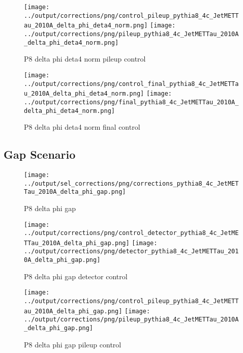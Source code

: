 \documentclass[11pt]{book}
\begin{document}
\begin{figure}[ht]
\centering
\texttt{[image: ../output/corrections/png/control\_pileup\_pythia8\_4c\_JetMETTau\_2010A\_delta\_phi\_deta4\_norm.png]}
\texttt{[image: ../output/corrections/png/pileup\_pythia8\_4c\_JetMETTau\_2010A\_delta\_phi\_deta4\_norm.png]}
\caption{P8 delta phi deta4 norm pileup control}
\label{fig:p8_JetMETTau_2010A_delta_phi_deta4_norm_pileup_control}
\end{figure}


\begin{figure}[ht]
\centering
\texttt{[image: ../output/corrections/png/control\_final\_pythia8\_4c\_JetMETTau\_2010A\_delta\_phi\_deta4\_norm.png]}
\texttt{[image: ../output/corrections/png/final\_pythia8\_4c\_JetMETTau\_2010A\_delta\_phi\_deta4\_norm.png]}
\caption{P8 delta phi deta4 norm final control}
\label{fig:p8_JetMETTau_2010A_delta_phi_deta4_norm_final_control}
\end{figure}

\clearpage
\subsection{Gap Scenario}

\begin{figure}[ht]
\centering
\texttt{[image: ../output/sel\_corrections/png/corrections\_pythia8\_4c\_JetMETTau\_2010A\_delta\_phi\_gap.png]}
\caption{P8 delta phi gap}
\label{fig:p8_JetMETTau_2010A_delta_phi_gap}
\end{figure}


\begin{figure}[ht]
\centering
\texttt{[image: ../output/corrections/png/control\_detector\_pythia8\_4c\_JetMETTau\_2010A\_delta\_phi\_gap.png]}
\texttt{[image: ../output/corrections/png/detector\_pythia8\_4c\_JetMETTau\_2010A\_delta\_phi\_gap.png]}
\caption{P8 delta phi gap detector control}
\label{fig:p8_JetMETTau_2010A_delta_phi_gap_detector_control}
\end{figure}

\begin{figure}[ht]
\centering
\texttt{[image: ../output/corrections/png/control\_pileup\_pythia8\_4c\_JetMETTau\_2010A\_delta\_phi\_gap.png]}
\texttt{[image: ../output/corrections/png/pileup\_pythia8\_4c\_JetMETTau\_2010A\_delta\_phi\_gap.png]}
\caption{P8 delta phi gap pileup control}
\label{fig:p8_JetMETTau_2010A_delta_phi_gap_pileup_control}
\end{figure}
\end{document}
